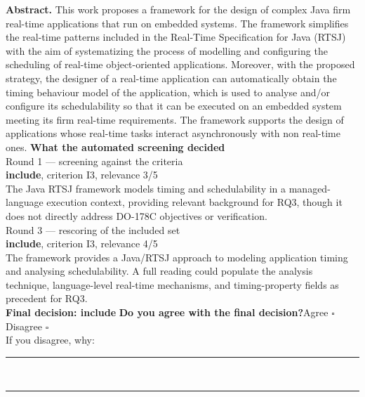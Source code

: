 \documentclass[11pt,a4paper]{article}
\begin{document}
{\small\textbf{Abstract.} This work proposes a framework for the design of complex Java firm real-time applications that run on embedded systems. The framework simplifies the real-time patterns included in the Real-Time Specification for Java (RTSJ) with the aim of systematizing the process of modelling and configuring the scheduling of real-time object-oriented applications. Moreover, with the proposed strategy, the designer of a real-time application can automatically obtain the timing behaviour model of the application, which is used to analyse and/or configure its schedulability so that it can be executed on an embedded system meeting its firm real-time requirements. The framework supports the design of applications whose real-time tasks interact asynchronously with non real-time ones.}
\vspace{3mm}
\vspace{2.5mm}
{\small\textbf{What the automated screening decided}}\\[2mm]
{\footnotesize\color{soft}Round 1 --- screening against the criteria}\\[0.5mm]
{\small\textbf{include}, criterion I3, relevance 3/5}\\[0.5mm]
{\small The Java RTSJ framework models timing and schedulability in a managed-language execution context, providing relevant background for RQ3, though it does not directly address DO-178C objectives or verification.}\\[2.5mm]
{\footnotesize\color{soft}Round 3 --- rescoring of the included set}\\[0.5mm]
{\small\textbf{include}, criterion I3, relevance 4/5}\\[0.5mm]
{\small The framework provides a Java/RTSJ approach to modeling application timing and analysing schedulability. A full reading could populate the analysis technique, language-level real-time mechanisms, and timing-property fields as precedent for RQ3.}\\[2.5mm]
{\small\textbf{Final decision: include}}
\vspace{2mm}
{\small\textbf{Do you agree with the final decision?}\quad{}Agree $\square$\qquad{}Disagree $\square$}\\[1mm]
{\footnotesize\color{soft}If you disagree, why:}\\[1mm]
\color{rule}\rule{\linewidth}{0.3pt}\\[3mm]\rule{\linewidth}{0.3pt}\color{black}
\end{document}
